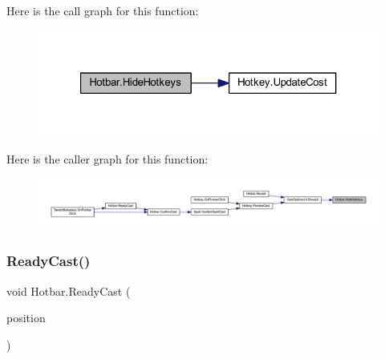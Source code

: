 Here is the call graph for this function\+:
\nopagebreak
\begin{figure}[H]
\begin{center}
\leavevmode
\includegraphics[width=321pt]{class_hotbar_a2f8af9863292223ae00d361121164160_cgraph}
\end{center}
\end{figure}
Here is the caller graph for this function\+:
\nopagebreak
\begin{figure}[H]
\begin{center}
\leavevmode
\includegraphics[width=350pt]{class_hotbar_a2f8af9863292223ae00d361121164160_icgraph}
\end{center}
\end{figure}
\mbox{\label{class_hotbar_a5ac379c585126b8e0e35c061b3388ecf}} 
\subsubsection{\texorpdfstring{ReadyCast()}{ReadyCast()}}
{\footnotesize\ttfamily void Hotbar.\+Ready\+Cast (\begin{DoxyParamCaption}\item[{Vector2\+Int}]{position }\end{DoxyParamCaption})}


